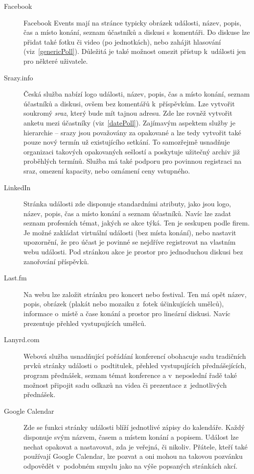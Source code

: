 \documentclass[12pt,oneside,final]{fithesis2}
\begin{document}
\begin{description}
    \item[Facebook]
        Facebook Events mají na stránce typicky obrázek události, název, popis, čas a místo konání, seznam účastníků a diskusi s~komentáři. Do diskuse lze přidat také fotku či video (po jednotkách), nebo zahájit hlasování (viz~\ref{genericPoll}). Důležitá je také možnost omezit přístup k~události jen pro některé uživatele.

    \item[Srazy.info]
        Česká služba nabízí logo události, název, popis, čas a místo konání, seznam účastníků a diskusi, ovšem bez komentářů k~příspěvkům. Lze vytvořit soukromý \emph{sraz}, který bude mít tajnou adresu. Zde lze rovněž vytvořit anketu mezi účastníky (viz~\ref{datePoll}). Zajímavým aspektem služby je hierarchie -- srazy jsou považovány za opakované a lze tedy vytvořit také pouze nový termín už existujícího setkání. To samozřejmě usnadňuje organizaci takových opakovaných sešlostí a poskytuje užitečný archiv již proběhlých termínů. Služba má také podporu pro povinnou registraci na sraz, omezení kapacity, nebo oznámení ceny vstupného.

    \item[LinkedIn]
        Stránka události zde disponuje standardními atributy, jako jsou logo, název, popis, čas a místo konání a seznam účastníků. Navíc lze zadat seznam profesních témat, jakých se akce týká. Ten je seskupen podle firem. Je možné zakládat virtuální události (bez místa konání), nebo nastavit upozornění, že pro účast je povinné se nejdříve registrovat na vlastním webu události. Pod stránkou akce je prostor pro jednoduchou diskusi bez zanořování příspěvků.

    \item[Last.fm]
        Na webu lze založit stránku pro koncert nebo festival. Ten má opět název, popis, obrázek (plakát nebo mozaiku z~fotek účinkujících umělců), informace o~místě a čase konání a prostor pro lineární diskusi. Navíc prezentuje přehled vystupujících umělců.

    \item[Lanyrd.com]
        Webová služba usnadňující pořádání konferencí obohacuje sadu tradičních prvků stránky události o~podtitulek, přehled vystupujících přednášejících, program přednášek, seznam témat konference a v~neposlední řadě také možnost připojit sadu odkazů na videa či prezentace z~jednotlivých přednášek.

    \item[Google Calendar]
        Zde se funkci stránky události blíží jednotlivé zápisy do kalendáře. Každý disponuje svým názvem, časem a místem konání a popisem. Událost lze nechat opakovat a nastavovat, zda je veřejná, či nikoliv. Přátele, kteří také používají Google Calendar, lze pozvat a oni mohou na takovou pozvánku odpovědět v~podobném smyslu jako na výše popsaných stránkách akcí.
\end{description}
\end{document}
